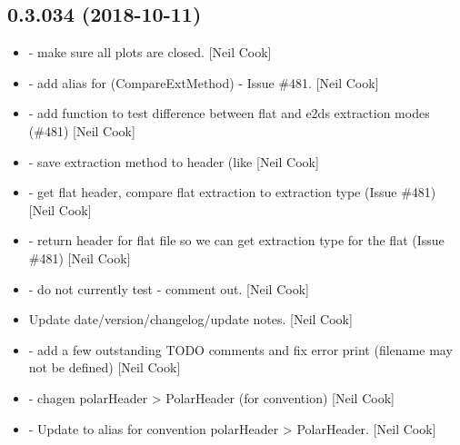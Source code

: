 \documentclass[a4paper,10pt,english]{report}
\begin{document}
\subsection{0.3.034 (2018-10-11)}
\label{\detokenize{misc/changelog:id297}}\begin{itemize}
\item {} 
 - make sure all plots are closed. {[}Neil Cook{]}

\item {} 
 - add alias for 
(CompareExtMethod) - Issue \#481. {[}Neil Cook{]}

\item {} 
 - add  function to test
difference between flat and e2ds extraction modes (\#481) {[}Neil Cook{]}

\item {} 
 - save extraction method to header (like
 {[}Neil Cook{]}

\item {} 
 - get flat header, compare flat extraction
to extraction type  (Issue \#481) {[}Neil Cook{]}

\item {} 
 - return header for flat file so we can get extraction
type for the flat (Issue \#481) {[}Neil Cook{]}

\item {} 
 - do not currently test  -
comment out. {[}Neil Cook{]}

\item {} 
Update date/version/changelog/update notes. {[}Neil Cook{]}

\item {} 
 - add a few outstanding TODO comments and fix error print
(filename may not be defined) {[}Neil Cook{]}

\item {} 
 - chagen polarHeader \textendash{}\textgreater{} PolarHeader (for
convention) {[}Neil Cook{]}

\item {} 
 - Update to alias for convention polarHeader \textendash{}\textgreater{}
PolarHeader. {[}Neil Cook{]}


\end{itemize}
\end{document}

